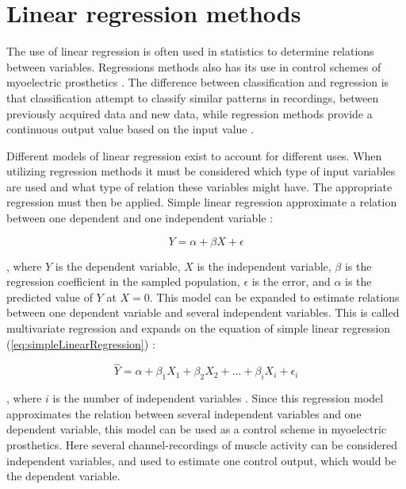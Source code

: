 \section{Linear regression methods}

The use of linear regression is often used in statistics to determine relations between variables. Regressions methods also has its use in control schemes of myoelectric prosthetics \cite{Hwang2017, Bruun2017, Hahne14}. The difference between classification and regression is that classification attempt to classify similar patterns in recordings, between previously acquired data and new data, while regression methods provide a continuous output value based on the input value \cite{Mendez2017, Hahne2014}. %

Different models of linear regression exist to account for different uses. When utilizing regression methods it must be considered which type of input variables are used and what type of relation these variables might have. The appropriate regression must then be applied. Simple linear regression approximate a relation between one dependent and one independent variable \cite{Zar2009}:

\begin{equation} \label{eq:simpleLinearRegression}
Y = \alpha + \beta X + \epsilon
\end{equation}

, where $Y$ is the dependent variable, $X$ is the independent variable, $\beta$ is the regression coefficient in the sampled population, $\epsilon$ is the error, and $\alpha$ is the predicted value of $Y$ at $X = 0$.
This model can be expanded to estimate relations between one dependent variable and several independent variables. This is called multivariate regression and expands on the equation of simple linear regression (\eqref{eq:simpleLinearRegression}) \cite{Zar2009}:

\begin{equation} \label{eq:multiLinearRegression}
\hat{Y} = \alpha + \beta_1 X_{1} + \beta_2 X_{2} + ... + \beta_i X_{i} + \epsilon_i
\end{equation} 

, where $i$ is the number of independent variables \cite{Zar2009}. Since this regression model approximates the relation between several independent variables and one dependent variable, this model can be used as a control scheme in myoelectric prosthetics. Here several channel-recordings of muscle activity can be considered independent variables, and used to estimate one control output, which would be the dependent variable. \cite{Bruun2017}